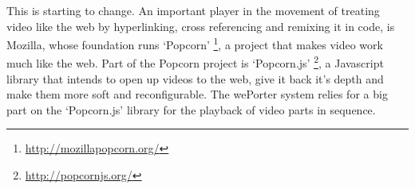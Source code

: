 This is starting to change. An important player in the movement of treating video like the web by hyperlinking, cross referencing and remixing it in code, is Mozilla, whose foundation runs `Popcorn' \footnote{\url{http://mozillapopcorn.org/}}, a project that makes video work much like the web. Part of the Popcorn project is `Popcorn.js' \footnote{\url{http://popcornjs.org/}}, a Javascript library that intends to open up videos to the web, give it back it's depth and make them more soft and reconfigurable. The wePorter system relies for a big part on the `Popcorn.js' library for the playback of video parts in sequence.


